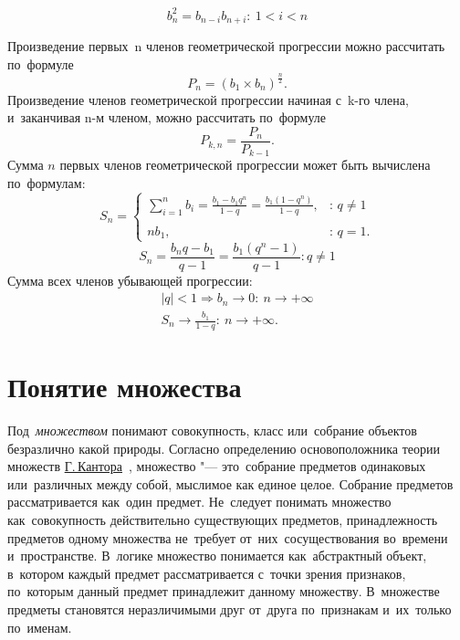 \documentclass[]{scrartcl}
\begin{document}
{{\begin{equation}\label{eq:geometric-progression-04}
b_{n}^{2}=b_{n-i}b_{n+i}:\ 1 < i < n
\end{equation}

Произведение первых~n членов геометрической прогрессии можно рассчитать по~формуле
\begin{equation}\label{eq:geometric-progression-05}
P_{n}=(b_{1}\times b_{n})^{\frac{n}{2}}.
\end{equation}
Произведение членов геометрической прогрессии начиная с~k-го члена, и~заканчивая n-м членом, можно рассчитать по~формуле
\begin{equation}\label{eq:geometric-progression-06}
P_{k,n}=\frac{P_{n}}{P_{k-1}}.
\end{equation}
Сумма ${\textstyle n}$ первых членов геометрической прогрессии может быть вычислена по~формулам:
\begin{equation}\label{eq:geometric-progression-07}
S_{n}={\begin{cases}\sum \limits_{i=1}^{n}b_{i}={\frac{b_{1}-b_{1}q^{n}}{1-q}}={\frac{b_{1}\left(1-q^{n}\right)}{1-q}},&{\mbox{: }}q\neq 1\\\\nb_{1},&{\mbox{: }}q=1.\end{cases}} 
\end{equation}
\begin{equation}\label{eq:geometric-progression-08}
S_n=\frac{b_{n}q-b_{1}}{q-1} = \frac{b_{1}(q^{n}-1)}{q-1}: q \neq 1
\end{equation}
Сумма всех членов убывающей прогрессии:
\begin{equation}\label{eq:geometric-progression-09}
\begin{aligned}
\left|q\right|<1 \Rightarrow b_n \to 0:\ n\to +\infty\\ 
S_{n}\to \frac{b_{1}}{1-q}:\ n\to +\infty.
\end{aligned}
\end{equation}


\section{Понятие множества}\label{multiple:definition}
Под~\emph{множеством} понимают совокупность, класс или~собрание объектов безразлично какой природы. Согласно определению основоположника теории множеств \href{https://ru.wikipedia.org/wiki/Кантор,_Георг}{Г.\,Кантора}~\cite{Wiki:Kantor}, множество "--- это~собрание предметов одинаковых или~различных между собой, мыслимое как единое целое. Собрание предметов рассматривается как~один предмет. Не~следует понимать множество как~совокупность действительно существующих предметов, принадлежность предметов одному множества не~требует от~них~сосуществования во~времени и~пространстве. В~логике множество понимается как~абстрактный объект, в~котором каждый предмет рассматривается с~точки зрения признаков, по~которым данный предмет принадлежит данному множеству. В~множестве предметы становятся неразличимыми друг от~друга по~признакам и~их~только по~именам.

}}
\end{document}
